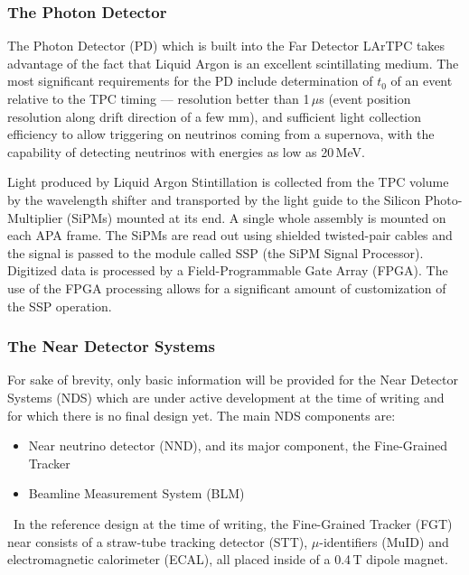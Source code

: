 \subsubsection{The Photon Detector}
\label{sec:pd}
The Photon Detector (PD) which is built into the Far Detector LArTPC takes advantage of the fact that Liquid Argon
is an excellent scintillating medium.
The most significant requirements for the PD include determination of $t_0$ of an event relative to the TPC timing ---
resolution better than 1\,$\mu$s (event position resolution along drift direction of a few mm), and sufficient light
collection efficiency to allow triggering on neutrinos coming from a supernova, with the capability of detecting neutrinos with energies as
low as 20\,MeV.

Light produced by Liquid Argon Stintillation is collected from the TPC volume by the wavelength shifter and transported
by the light guide to the Silicon Photo-Multiplier (SiPMs) mounted at its end. A single whole assembly is mounted on each  APA frame.
The SiPMs are read out using shielded twisted-pair cables and the signal is passed to the module called SSP (the SiPM Signal
Processor). Digitized data is processed by a  Field-Programmable Gate Array (FPGA). The use
of the FPGA processing allows for a significant amount of customization of the SSP operation.


\subsubsection{The Near Detector Systems}
\label{sec:nds-params}
For sake of brevity, only basic information will be provided for the Near Detector Systems (NDS) which are under active development
at the time of writing and for which there is no final design yet. The main NDS components are:
\begin{itemize}
\item Near neutrino detector (NND), and its major component, the Fine-Grained Tracker
\item Beamline Measurement System (BLM)
\end{itemize}
\ 
In the reference design at the time of writing, the Fine-Grained Tracker (FGT) near consists of a straw-tube
tracking detector (STT), $\mu$-identifiers (MuID) and electromagnetic calorimeter (ECAL), all placed inside of a 0.4\,T dipole magnet.

